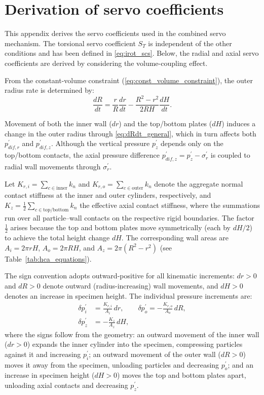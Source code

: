 \documentclass[a4paper,fleqn]{cas-sc}
\begin{document}
 \section{Derivation of servo coefficients}
\label{sec:appendix_servo}

This appendix derives the servo coefficients used in the combined servo mechanism. The torsional servo coefficient $S_T$ is independent of the other conditions and has been defined in \cref{eq:irot_scs}. Below, the radial and axial servo coefficients are derived by considering the volume-coupling effect.

From the constant-volume constraint (\cref{eq:const_volume_constraint}), the outer radius rate is determined by:
\begin{equation}
\frac{dR}{dt} = \frac{r}{R}\frac{dr}{dt} - \frac{R^2-r^2}{2RH}\frac{dH}{dt}.
\label{eq:dRdt_general}
\end{equation}

Movement of both the inner wall ($dr$) and the top/bottom plates ($dH$) induces a change in the outer radius through \cref{eq:dRdt_general}, which in turn affects both $p_{dif,r}^{\prime}$ and $p_{dif,z}^{\prime}$. Although the vertical pressure $p_z^{\prime}$ depends only on the top/bottom contacts, the axial pressure difference $p_{dif,z}^{\prime}=p_z^{\prime}-\sigma_r^{\prime}$ is coupled to radial wall movements through $\sigma_r^{\prime}$.

Let $K_{r,i}=\sum_{c\in\mathrm{inner}} k_n$ and $K_{r,o}=\sum_{c\in\mathrm{outer}} k_n$ denote the aggregate normal contact stiffness at the inner and outer cylinders, respectively, and $K_z=\frac{1}{2}\sum_{c\in\mathrm{top/bottom}} k_n$ the effective axial contact stiffness, where the summations run over all particle--wall contacts on the respective rigid boundaries. The factor $\frac{1}{2}$ arises because the top and bottom plates move symmetrically (each by $dH/2$) to achieve the total height change $dH$. The corresponding wall areas are $A_i=2\pi rH$, $A_o=2\pi RH$, and $A_z=2\pi(R^2-r^2)$ (see Table~\ref{tab:hca_equations}).

The sign convention adopts outward-positive for all kinematic increments: $dr>0$ and $dR>0$ denote outward (radius-increasing) wall movements, and $dH>0$ denotes an increase in specimen height. The individual pressure increments are:
\begin{align}
\delta p_i^{\prime} &= \frac{K_{r,i}}{A_i}\,dr,\qquad
\delta p_o^{\prime} = -\frac{K_{r,o}}{A_o}\,dR, \label{eq:dp_individual_r}\\[4pt]
\delta p_z^{\prime} &= -\frac{K_z}{A_z}\,dH, \label{eq:dp_individual_z}
\end{align}
where the signs follow from the geometry: an outward movement of the inner wall ($dr>0$) expands the inner cylinder into the specimen, compressing particles against it and increasing $p_i^{\prime}$; an outward movement of the outer wall ($dR>0$) moves it away from the specimen, unloading particles and decreasing $p_o^{\prime}$; and an increase in specimen height ($dH>0$) moves the top and bottom plates apart, unloading axial contacts and decreasing $p_z^{\prime}$.
\end{document}
